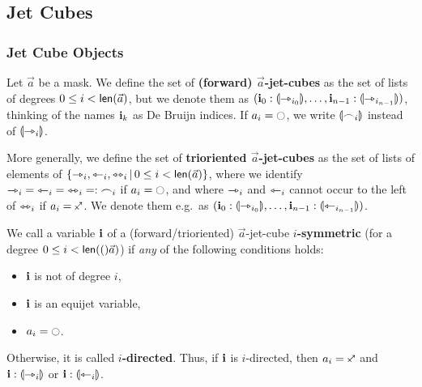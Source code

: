 \documentclass[a4paper]{article}
\begin{document}
\subsection{Jet Cubes}

\subsubsection{Jet Cube Objects}
\begin{definition} \label{def:jet-cube}
	Let $\vec a$ be a mask.
	We define the set of \textbf{(forward) $\vec{a}$-jet-cubes} as the set of lists of degrees $0 \leq i < \mathsf{len}(\vec a)$, but we denote them as
	$(\mathbf{i}_0 : {\llparenthesis \rightarrowtriangle_{i_0} \rrparenthesis}, \ldots, \mathbf{i}_{n-1} : {\llparenthesis \rightarrowtriangle_{i_{n-1}} \rrparenthesis})$, thinking of the names $\mathbf{i}_k$ as De Bruijn indices.
	If $a_i = \npolar$, we write ${\llparenthesis \frown_i \rrparenthesis}$ instead of ${\llparenthesis \rightarrowtriangle_i \rrparenthesis}$.
	
	
	More generally, we define the set of \textbf{trioriented $\vec a$-jet-cubes} as the set of lists of elements of \linebreak $\mathopen{}\left\{ \rightarrowtriangle_i, \leftarrowtriangle_i, \leftrightarrowtriangle_i \,\middle|\, 0 \leq i < \mathsf{len}(\vec a) \right\}\mathclose{}$, where we identify ${\rightarrowtriangle_i} = {\leftarrowtriangle_i} = {\leftrightarrowtriangle_i} =: {\frown_i}$ if $a_i = \npolar$, and where $\rightarrowtriangle_i$ and $\leftarrowtriangle_i$ cannot occur to the left of $\leftrightarrowtriangle_i$ if $a_i = \ypolar$.
	We denote them e.g.\ as $(\mathbf{i}_0 : {\llparenthesis \rightarrowtriangle_{i_0} \rrparenthesis}, \ldots, \mathbf{i}_{n-1} : {\llparenthesis \leftarrowtriangle_{i_{n-1}} \rrparenthesis})$.
\end{definition}
\begin{definition} \label{def:symmetric-var}
	We call a variable $\mathbf{i}$ of a (forward/trioriented) $\vec a$-jet-cube \textbf{$i$-symmetric} (for a degree $0 \leq i < \mathsf{len}(()\vec a)$) if \emph{any} of the following conditions holds:
	\begin{itemize}
		\item $\mathbf{i}$ is not of degree $i$,
		\item $\mathbf{i}$ is an equijet variable,
		\item $a_i = \npolar$.
	\end{itemize}
	Otherwise, it is called \textbf{$i$-directed}.
	Thus, if $\mathbf{i}$ is $i$-directed, then $a_i = \ypolar$ and $\mathbf{i} : {\llparenthesis \rightarrowtriangle_i \rrparenthesis}$ or $\mathbf{i} : {\llparenthesis \leftarrowtriangle_i \rrparenthesis}$.
\end{definition}
\end{document}
